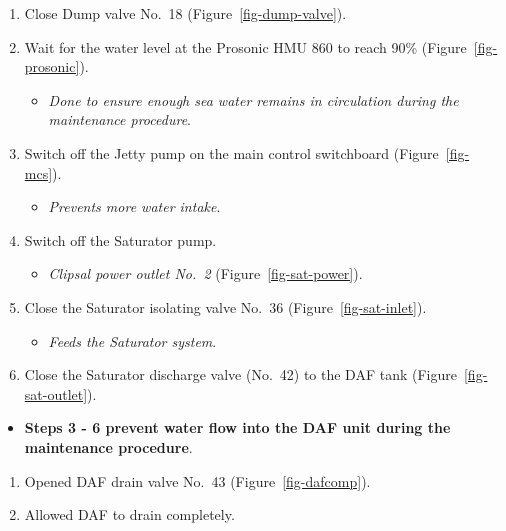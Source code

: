 \documentclass[
  letterpaper,
  DIV=11,
  numbers=noendperiod]{scrreprt}
\providecommand{\tightlist}{%
  \setlength{\itemsep}{0pt}\setlength{\parskip}{0pt}}\usepackage{longtable,booktabs,array}
\begin{document}
\begin{enumerate}
\def\labelenumi{\arabic{enumi}.}
\tightlist
\item
  Close Dump valve No.~18 (Figure~\ref{fig-dump-valve}).
\item
  Wait for the water level at the Prosonic HMU 860 to reach 90\%
  (Figure~\ref{fig-prosonic}).

  \begin{itemize}
  \tightlist
  \item
    \emph{Done to ensure enough sea water remains in circulation during
    the maintenance procedure}.
  \end{itemize}
\item
  Switch off the Jetty pump on the main control switchboard
  (Figure~\ref{fig-mcs}).

  \begin{itemize}
  \tightlist
  \item
    \emph{Prevents more water intake}.
  \end{itemize}
\item
  Switch off the Saturator pump.

  \begin{itemize}
  \tightlist
  \item
    \emph{Clipsal power outlet No.~2} (Figure~\ref{fig-sat-power}).
  \end{itemize}
\item
  Close the Saturator isolating valve No.~36
  (Figure~\ref{fig-sat-inlet}).

  \begin{itemize}
  \tightlist
  \item
    \emph{Feeds the Saturator system}.
  \end{itemize}
\item
  Close the Saturator discharge valve (No.~42) to the DAF tank
  (Figure~\ref{fig-sat-outlet}).
\end{enumerate}

\begin{itemize}
\tightlist
\item
  \textbf{Steps 3 - 6 prevent water flow into the DAF unit during the
  maintenance procedure}.
\end{itemize}

\begin{enumerate}
\def\labelenumi{\arabic{enumi}.}
\setcounter{enumi}{6}
\tightlist
\item
  Opened DAF drain valve No.~43 (Figure~\ref{fig-dafcomp}).
\item
  Allowed DAF to drain completely.
\end{enumerate}
\end{document}
